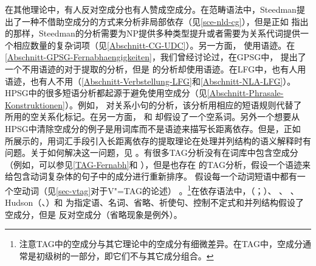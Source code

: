在其他理论中，有人反对空成分也有人赞成空成分。在范畴语法\indexcgc 中，Steedman提出了一种不借助空成分的方式来分析非局部依存（见\ref{sce-nld-cg}），但是正如 \citet{Pollard88a}指出的那样，Steedman的分析需要为NP提供多种类型提升或者需要为关系代词提供一个相应数量的复杂词项（见\ref{Abschnitt-CG-UDC}）。另一方面， \citet{KoenigE99a-u}使用语迹。在\ref{Abschnitt-GPSG-Fernabhaengigkeiten}，我们曾经讨论过，在GPSG\indexgpsgc 中， \citet[--77]{Uszkoreit87a}提出了一个不用语迹的对于提取的分析，但是 \citet*[]{GKPS85a}的分析却使用语迹。在LFG\indexlfgc 中，也有人用语迹\citep[]{Bresnan2001a}，也有人不用（\ref{Abschnitt-Verbstellung-LFG}和\ref{Abschnitt-NLA-LFG}）。HPSG\indexhpsgc 中的很多短语分析都起源于避免使用空成分（见\ref{Abschnitt-Phrasale-Konstruktionen}）。例如， \citet{Sag97a}对关系小句的分析，该分析用相应的短语规则代替了 所用的空关系化标记。在另一方面， 和 却假设了一个空系词。另外一个想要从HPSG中清除空成分的例子是用词库而不是语迹来描写长距离依存\citep*{BMS2001a}。但是，正如  \citet{LH2006a}所展示的，用词汇手段引入长距离依存的提取理论在处理并列结构的语义解释时有问题。关于如何解决这一问题，见 。有很多TAG分析\indextagc 没有在词库中包含空成分（例如，可以参见\ref{TAG-Fernabh}和 ），但是也存在 \citet[]{Kallmeyer2005a-u}的TAG分析，假设一个语迹来给包含动词复杂体的句子中的成分进行重新排序。 \citet[--11]{Rambow94a}假设每一个动词短语中都有一个空动词（见\ref{sec-vtag}对于V"=TAG的论述） 。\footnote{%
注意TAG中的空成分与其它理论中的空成分有细微差异。在TAG中，空成分通常是初级树的一部分，即它们不与其它成分组合。  
}在依存语法中，\mel （\citeyear[]{Melcuk88a-u}；\citeyear[]{Melcuk2003a-u}）、 \citet[]{Starosta88a-u}、 \citet[--472]{Eroms2000a}、Hudson（\citeyear[\S~3.7]{Hudson2007a-u}、\citeyear[]{Hudson2010b-u}）和 \citet{Engel2014a}为指定语、名词、省略、祈使句、控制不定式和并列结构假设了空成分，但是 \citet[]{GO2009a}反对空成分（省略现象是例外\citealp{Osborne2016a-u}）。
